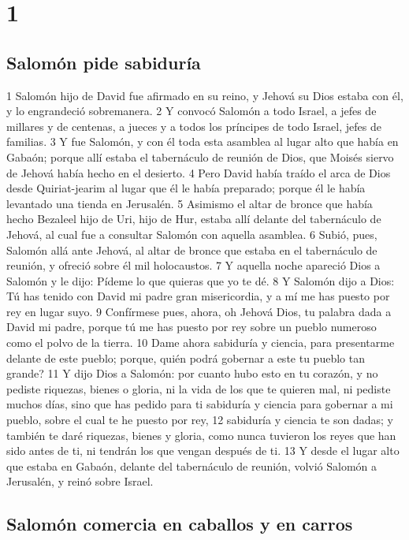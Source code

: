 
\chapter{1}

\section*{Salomón pide sabiduría}

1 Salomón hijo de David fue afirmado en su reino, y Jehová su Dios estaba con él, y lo engrandeció sobremanera.
2 Y convocó Salomón a todo Israel, a jefes de millares y de centenas, a jueces y a todos los príncipes de todo Israel, jefes de familias.
3  Y fue Salomón, y con él toda esta asamblea al lugar alto que había en Gabaón; porque allí estaba el tabernáculo de reunión de Dios, que Moisés siervo de Jehová había hecho en el desierto.
4 Pero David había traído el arca de Dios desde Quiriat-jearim al lugar que él le había preparado;  porque él le había levantado una tienda en Jerusalén. 
 5 Asimismo el altar de bronce que había hecho Bezaleel hijo de Uri, hijo de Hur, estaba allí delante del tabernáculo de Jehová, al cual fue a consultar Salomón con aquella asamblea. 
6 Subió, pues, Salomón allá ante Jehová, al altar de bronce que estaba en el tabernáculo de reunión, y ofreció sobre él mil holocaustos.
7 Y aquella noche apareció Dios  a Salomón y le dijo: Pídeme lo que quieras que yo te dé.
8 Y Salomón dijo a Dios: Tú has tenido con David mi padre gran misericordia, y a mí me has puesto por rey en  lugar suyo.
9 Confírmese pues, ahora, oh Jehová Dios,  tu palabra dada a David mi padre, porque tú me has puesto por rey sobre un pueblo numeroso como el polvo de la tierra. 
10 Dame ahora sabiduría y ciencia, para presentarme delante de este pueblo; porque, quién podrá gobernar a este tu pueblo tan grande?
11 Y dijo Dios a Salomón: por cuanto hubo esto en tu corazón, y no pediste riquezas, bienes o gloria, ni la vida de los que te quieren mal, ni pediste muchos días, sino que has pedido para ti sabiduría y ciencia para gobernar a mi pueblo, sobre el cual te he puesto por rey,
12 sabiduría y ciencia te son dadas; y también te daré riquezas, bienes y gloria, como nunca tuvieron los reyes que han sido antes de ti, ni tendrán los que vengan después de ti.
13 Y desde el lugar alto que estaba en Gabaón, delante del tabernáculo de reunión, volvió Salomón a Jerusalén, y reinó sobre Israel.

\section*{Salomón comercia en caballos y en carros}

